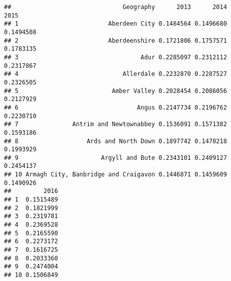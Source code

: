 \documentclass[]{article}
\newenvironment{Shaded}{\begin{snugshade}}{\end{snugshade}}
\newcommand{\KeywordTok}[1]{\textcolor[rgb]{0.13,0.29,0.53}{\textbf{#1}}}
\newcommand{\DecValTok}[1]{\textcolor[rgb]{0.00,0.00,0.81}{#1}}
\newcommand{\StringTok}[1]{\textcolor[rgb]{0.31,0.60,0.02}{#1}}
\newcommand{\CommentTok}[1]{\textcolor[rgb]{0.56,0.35,0.01}{\textit{#1}}}
\newcommand{\ControlFlowTok}[1]{\textcolor[rgb]{0.13,0.29,0.53}{\textbf{#1}}}
\newcommand{\OperatorTok}[1]{\textcolor[rgb]{0.81,0.36,0.00}{\textbf{#1}}}
\newcommand{\NormalTok}[1]{#1}
\begin{document}
\begin{Shaded}
\end{Shaded}

\begin{verbatim}
##                               Geography      2013      2014      2015
## 1                         Aberdeen City 0.1484564 0.1496680 0.1494508
## 2                         Aberdeenshire 0.1721806 0.1757571 0.1783135
## 3                                  Adur 0.2285097 0.2312112 0.2317867
## 4                             Allerdale 0.2232870 0.2287527 0.2326505
## 5                          Amber Valley 0.2028454 0.2086056 0.2127929
## 6                                 Angus 0.2147734 0.2196762 0.2230710
## 7               Antrim and Newtownabbey 0.1536091 0.1571382 0.1593186
## 8                   Ards and North Down 0.1897742 0.1470218 0.1993929
## 9                       Argyll and Bute 0.2343101 0.2409127 0.2454137
## 10 Armagh City, Banbridge and Craigavon 0.1446871 0.1459609 0.1490926
##         2016
## 1  0.1515489
## 2  0.1821999
## 3  0.2319781
## 4  0.2369528
## 5  0.2165590
## 6  0.2273172
## 7  0.1616725
## 8  0.2033360
## 9  0.2474004
## 10 0.1506849
\end{verbatim}
\end{document}
